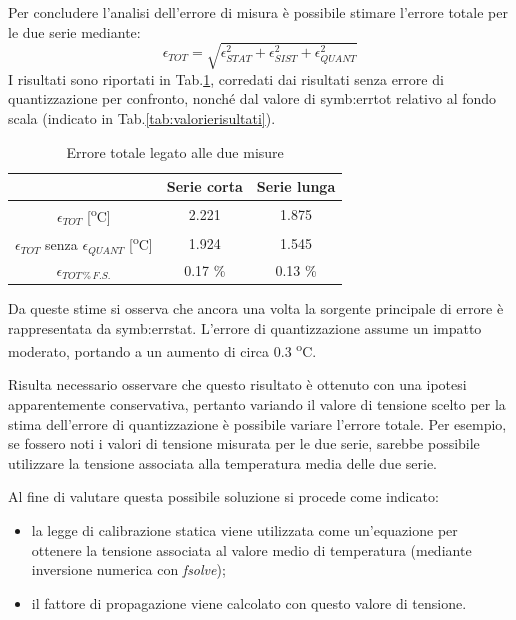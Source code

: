 Per concludere l'analisi dell'errore di misura è possibile stimare l'errore totale per le due serie mediante:
\begin{equation}
	\epsilon_{\textit{TOT}}=\sqrt{\epsilon_{\textit{STAT}}^2+\epsilon_{\textit{SIST}}^2+\epsilon_{\textit{QUANT}}^2}
\end{equation}
I risultati sono riportati in Tab.\ref{tab:risultatitot}, corredati dai risultati senza errore di quantizzazione per confronto, nonché dal valore di \gls{symb:errtot} relativo al fondo scala (indicato in Tab.\ref{tab:valorierisultati}).
\begin{table}[H]
	\centering
	\begin{tabular}{c|c|c}
		\toprule
		\toprule
		& \textbf{Serie corta} & \textbf{Serie lunga} \\
		\midrule
		$\epsilon_{\textit{TOT}}$ [\textsuperscript{o}C] & 2.221 & 1.875 \\
		\midrule
		$\epsilon_{\textit{TOT}}$ senza $\epsilon_{\textit{QUANT}}$ [\textsuperscript{o}C] & 1.924 & 1.545 \\
		\midrule
		$\epsilon_{\textit{TOT}\, \% \, F.S.}$ & 0.17 \% & 0.13 \% \\
		\bottomrule
		\bottomrule
	\end{tabular}
	\caption{Errore totale legato alle due misure}
	\label{tab:risultatitot}
\end{table}
Da queste stime si osserva che ancora una volta la sorgente principale di errore è rappresentata da \gls{symb:errstat}. L'errore di quantizzazione assume un impatto moderato, portando a un aumento di circa 0.3 \textsuperscript{o}C.

Risulta necessario osservare che questo risultato è ottenuto con una ipotesi apparentemente conservativa, pertanto variando il valore di tensione scelto per la stima dell'errore di quantizzazione è possibile variare l'errore totale. Per esempio, se fossero noti i valori di tensione misurata per le due serie, sarebbe possibile utilizzare la tensione associata alla temperatura media delle due serie.

Al fine di valutare questa possibile soluzione si procede come indicato:
\begin{itemize}
	\item la legge di calibrazione statica viene utilizzata come un'equazione per ottenere la tensione associata al valore medio di temperatura (mediante inversione numerica con \textit{fsolve});
	\item il fattore di propagazione viene calcolato con questo valore di tensione. 
\end{itemize} 

